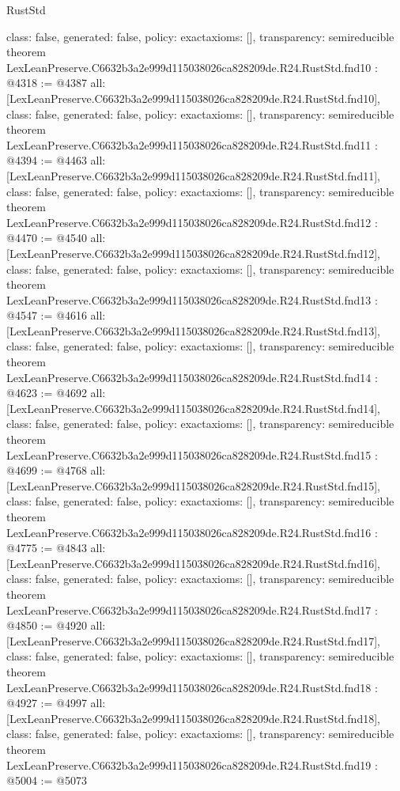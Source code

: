 \begin{lexlean}{RustStd}
\begin{coremodule}
{  class: false,
  generated: false,
  policy: exact{axioms: []},
  transparency: semireducible
}
theorem LexLeanPreserve.C6632b3a2e999d115038026ca828209de.R24.RustStd.fnd10 : @4318 := @4387 {
  all: [LexLeanPreserve.C6632b3a2e999d115038026ca828209de.R24.RustStd.fnd10],
  class: false,
  generated: false,
  policy: exact{axioms: []},
  transparency: semireducible
}
theorem LexLeanPreserve.C6632b3a2e999d115038026ca828209de.R24.RustStd.fnd11 : @4394 := @4463 {
  all: [LexLeanPreserve.C6632b3a2e999d115038026ca828209de.R24.RustStd.fnd11],
  class: false,
  generated: false,
  policy: exact{axioms: []},
  transparency: semireducible
}
theorem LexLeanPreserve.C6632b3a2e999d115038026ca828209de.R24.RustStd.fnd12 : @4470 := @4540 {
  all: [LexLeanPreserve.C6632b3a2e999d115038026ca828209de.R24.RustStd.fnd12],
  class: false,
  generated: false,
  policy: exact{axioms: []},
  transparency: semireducible
}
theorem LexLeanPreserve.C6632b3a2e999d115038026ca828209de.R24.RustStd.fnd13 : @4547 := @4616 {
  all: [LexLeanPreserve.C6632b3a2e999d115038026ca828209de.R24.RustStd.fnd13],
  class: false,
  generated: false,
  policy: exact{axioms: []},
  transparency: semireducible
}
theorem LexLeanPreserve.C6632b3a2e999d115038026ca828209de.R24.RustStd.fnd14 : @4623 := @4692 {
  all: [LexLeanPreserve.C6632b3a2e999d115038026ca828209de.R24.RustStd.fnd14],
  class: false,
  generated: false,
  policy: exact{axioms: []},
  transparency: semireducible
}
theorem LexLeanPreserve.C6632b3a2e999d115038026ca828209de.R24.RustStd.fnd15 : @4699 := @4768 {
  all: [LexLeanPreserve.C6632b3a2e999d115038026ca828209de.R24.RustStd.fnd15],
  class: false,
  generated: false,
  policy: exact{axioms: []},
  transparency: semireducible
}
theorem LexLeanPreserve.C6632b3a2e999d115038026ca828209de.R24.RustStd.fnd16 : @4775 := @4843 {
  all: [LexLeanPreserve.C6632b3a2e999d115038026ca828209de.R24.RustStd.fnd16],
  class: false,
  generated: false,
  policy: exact{axioms: []},
  transparency: semireducible
}
theorem LexLeanPreserve.C6632b3a2e999d115038026ca828209de.R24.RustStd.fnd17 : @4850 := @4920 {
  all: [LexLeanPreserve.C6632b3a2e999d115038026ca828209de.R24.RustStd.fnd17],
  class: false,
  generated: false,
  policy: exact{axioms: []},
  transparency: semireducible
}
theorem LexLeanPreserve.C6632b3a2e999d115038026ca828209de.R24.RustStd.fnd18 : @4927 := @4997 {
  all: [LexLeanPreserve.C6632b3a2e999d115038026ca828209de.R24.RustStd.fnd18],
  class: false,
  generated: false,
  policy: exact{axioms: []},
  transparency: semireducible
}
theorem LexLeanPreserve.C6632b3a2e999d115038026ca828209de.R24.RustStd.fnd19 : @5004 := @5073 {
}
\end{coremodule}
\end{lexlean}
